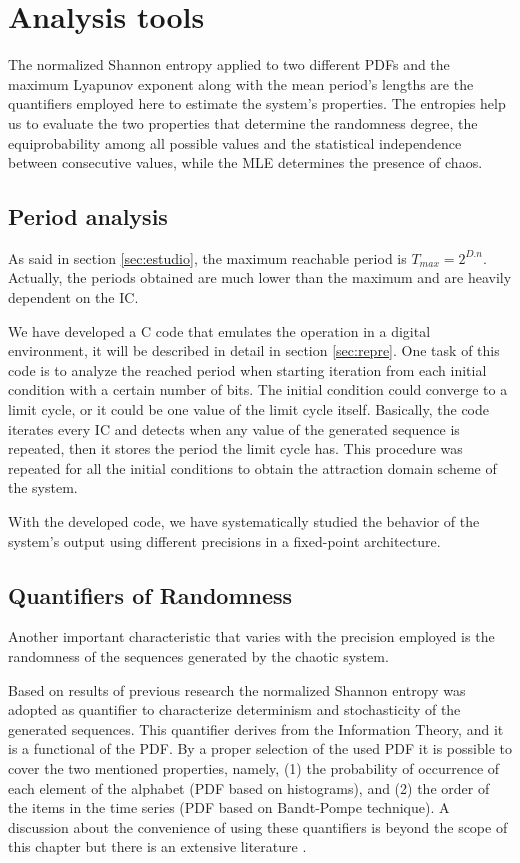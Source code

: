 \section{Analysis tools}
\label{sec:quanti}

The normalized Shannon entropy applied to two different PDFs and the maximum Lyapunov exponent along with the mean period's lengths are the quantifiers employed here to estimate the system's properties. The entropies   help us to evaluate the two properties that determine the randomness degree, the equiprobability among all possible values and the statistical independence between consecutive values, while the MLE determines the presence of chaos. 
 
\subsection{Period analysis}

As said in section \ref{sec:estudio}, the maximum reachable period is $T_{max}=2^{D.n}$. Actually, the periods obtained are much lower than the maximum and are heavily dependent on the IC.

We have developed a C code that emulates the operation in a digital environment, it will be described in detail in section \ref{sec:repre}. One task of this code is to analyze the reached period when starting iteration from each initial condition with a certain number of bits. The initial condition could converge to a limit cycle, or it could be one value of the limit cycle itself. Basically, the code iterates every IC and detects when any value of the generated sequence is repeated, then it stores the period the limit cycle has.
This procedure was repeated for all the initial
conditions to obtain the attraction domain scheme of the
system.


With the developed code, we have systematically studied the behavior of the system's output
using different precisions in a fixed-point architecture.\subsection{Quantifiers of Randomness}
\label{cu_ran}

Another important characteristic that varies with the precision employed is the randomness of the sequences generated by the chaotic system. 

Based on results of previous research \cite{DeMicco2008,Antonelli2016,DeMicco2011} the normalized Shannon entropy was adopted as quantifier to characterize determinism and stochasticity of the generated sequences. This quantifier derives from the Information Theory, and it is a functional of the PDF. By a proper selection of the used PDF it is possible to cover the two mentioned properties, namely, (1) the probability of occurrence of each element of the alphabet (PDF based on histograms), and (2) the order of the items in the time series (PDF based on Bandt-Pompe technique).
A discussion about the convenience of using these quantifiers is beyond the scope of this chapter but there is an extensive literature \cite{Rosso2007A,DeMicco2008,Martin2006}.

